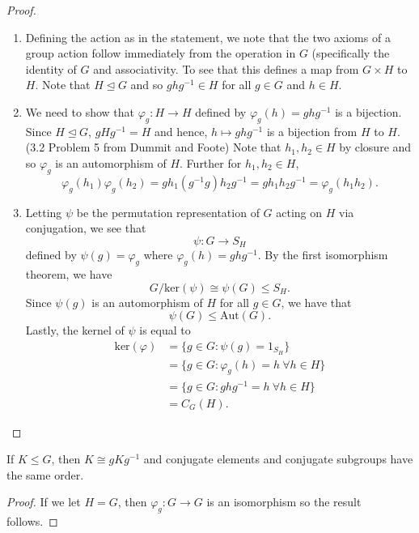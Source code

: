 \begin{proof}
\begin{enumerate}
    \item[(1)] Defining the action as in the statement, we note that the two axioms of a group action follow immediately from the operation in \( G  \) (specifically the identity of \( G  \) and associativity. To see that this defines a map from \( G \times H  \) to \( H  \). Note that \( H \trianglelefteq G  \) and so \( g h g^{-1} \in H   \) for all \( g \in G  \) and \( h \in H  \).   
    \item[(2)] We need to show that \( {\varphi}_{g} : H \to H  \) defined by \( {\varphi}_{g}(h) = g h g^{-1}\) is a bijection. Since \( H \trianglelefteq G  \), \( g H g^{-1} = H  \) and hence, \( h \mapsto g h g^{-1} \) is a bijection from \( H  \) to \( H  \). (3.2 Problem 5 from Dummit and Foote)
Note that \( {h}_{1}, {h}_{2} \in H  \) by closure and so \( {\varphi}_{g}  \) is an automorphism of \( H  \). Further for \( {h}_{1}, {h}_{2} \in H \),
        \[  {\varphi}_{g}({h}_{1}) {\varphi}_{g}({h}_{2})  = g {h}_{1} (g^{-1} g ) {h}_{2} g^{-1}  =  g {h}_{1} {h}_{2} g^{-1} = {\varphi}_{g}({h}_{1}{h}_{2}). \]

    \item[(3)]      Letting \( \psi  \) be the permutation representation of \( G  \) acting on \( H  \) via conjugation, we see that 
    \[  \psi: G \to {S}_{H} \]
    defined by \( \psi(g) = {\varphi}_{g} \)
    where \( {\varphi}_{g}(h) = g h g^{-1} \). By the first isomorphism theorem, we have  
    \[  G / \text{ker}(\psi) \cong \psi(G) \leq {S}_{H}. \]
    Since \( \psi(g) \) is an automorphism of \( H  \) for all \( g \in G  \), we have that 
    \[  \psi(G) \leq \text{Aut}(G). \]
    Lastly, the kernel of \( \psi  \) is equal to
    \begin{align*}
        \text{ker}(\varphi) &= \{  g \in G : \psi(g) = {1}_{{S}_{H}} \}  \\
                            &= \{ g \in G : {\varphi}_{g}(h) = h \ \forall h \in H  \} \\ 
                            &= \{  g \in G : g h g^{-1} = h \ \forall h \in H  \} \\
                            &= {C}_{G}(H).
    \end{align*}
\end{enumerate}
\end{proof}

\begin{corollary}
    If \( K \leq G  \), then \( K \cong g K g^{-1} \) and conjugate elements and conjugate subgroups have the same order.  
\end{corollary}
\begin{proof}
If we let \( H = G  \), then \( {\varphi}_{g} : G \to G  \) is an isomorphism so the result follows. 
\end{proof}


